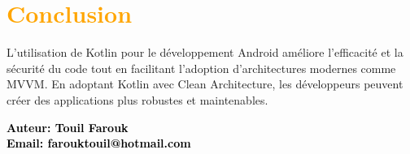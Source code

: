 \section{\textcolor{orange}{Conclusion}}\label{sec:conclusion}
L'utilisation de Kotlin pour le développement Android améliore l'efficacité et la sécurité du code tout en facilitant l'adoption d'architectures modernes comme MVVM. En adoptant Kotlin avec Clean Architecture, les développeurs peuvent créer des applications plus robustes et maintenables.

\begin{center}
\textbf{\textcolor{black}{Auteur: Touil Farouk}} \\  %
\textbf{\textcolor{black}{Email: farouktouil@hotmail.com}}
\end{center}
\fancyfoot[C]{\thepage}
